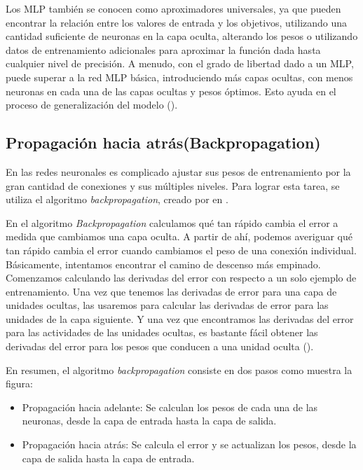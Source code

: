 Los MLP también se conocen como aproximadores universales, ya que pueden encontrar la relación entre los valores de entrada y los objetivos, utilizando una cantidad suficiente de neuronas en la capa oculta, alterando los pesos o utilizando datos de entrenamiento adicionales para aproximar la función dada hasta cualquier nivel de precisión. A menudo, con el grado de libertad dado a un MLP, puede superar a la red MLP básica, introduciendo más capas ocultas, con menos neuronas en cada una de las capas ocultas y pesos óptimos. Esto ayuda en el proceso de generalización del modelo (\cite{goyal2018Deep}).

\subsection{Propagación hacia atrás(Backpropagation)}

En las redes neuronales es complicado ajustar sus pesos de entrenamiento por la gran cantidad de conexiones y sus múltiples niveles. Para lograr esta tarea, se utiliza el algoritmo \textit{backpropagation}, creado por \citeauthor{rumelhart1986Parallel} en \citeyear{rumelhart1986Parallel}.

En el algoritmo \textit{Backpropagation} calculamos qué tan rápido cambia el error a medida que cambiamos una capa oculta. A partir de ahí, podemos averiguar qué tan rápido cambia el error cuando cambiamos el peso de una conexión individual. Básicamente, intentamos encontrar el camino de descenso más empinado. Comenzamos calculando las derivadas del error con respecto a un solo ejemplo de entrenamiento. Una vez que tenemos las derivadas de error para una capa de unidades ocultas, las usaremos para calcular las derivadas de error para las unidades de la capa siguiente. Y una vez que encontramos las derivadas del error para las actividades de las unidades ocultas, es bastante fácil obtener las derivadas del error para los pesos que conducen a una unidad oculta (\cite{buduma2017Fundamentals}).

En resumen, el algoritmo \textit{backpropagation} consiste en dos pasos como muestra la figura:

\begin{itemize}
\item Propagación hacia adelante: Se calculan los pesos de cada una de las neuronas, desde la capa de entrada hasta la capa de salida.

\item Propagación hacia atrás: Se calcula el error y se actualizan los pesos, desde la capa de salida hasta la capa de entrada.
\end{itemize}

